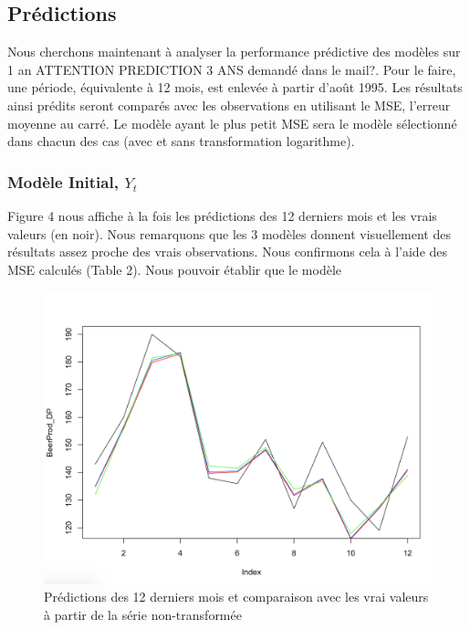 \documentclass[12pt,a4paper]{book}
\newcommand{\1}{\mathds{1}}
\begin{document}
\vspace{5 mm}
\subsection{Prédictions}

Nous cherchons maintenant à analyser la performance prédictive des modèles sur 1 an ATTENTION PREDICTION 3 ANS demandé dans le mail?. Pour le faire, une période, équivalente à 12 mois, est enlevée à partir d'août 1995. Les résultats ainsi prédits seront comparés avec les observations en utilisant le MSE, l'erreur moyenne au carré. Le modèle ayant le plus petit MSE sera le modèle sélectionné dans chacun des cas (avec et sans transformation logarithme). 


\subsubsection{Modèle Initial, $Y_t$}

Figure 4 nous affiche à la fois les prédictions des 12 derniers mois et les vrais valeurs (en noir). Nous remarquons que les 3 modèles donnent visuellement des résultats assez proche des vrais observations. Nous confirmons cela à l'aide des MSE calculés (Table 2). Nous pouvoir établir que le modèle 

\begin{figure}[h]
  		\centering
    	\includegraphics[scale=0.4]{Prediction_Initial}  
\caption{Prédictions des 12 derniers mois et comparaison avec les vrai valeurs à partir de la série non-transformée}
\label{fig:1}
\end{figure}
\end{document}

